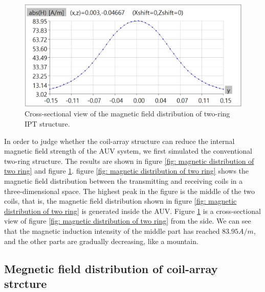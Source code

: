 \begin{figure}[!t]
    \centering
    \includegraphics[width=0.9\linewidth]{images/4_two_ring_near_field_distribution_cut.JPG}
    \caption{Cross-sectional view of the magnetic field distribution of two-ring IPT structure.}
    \label{fig: magnetic distribution of two ring cut}
\end{figure}


In order to judge whether the coil-array structure can reduce the internal magnetic field strength of the AUV system, we first simulated the conventional two-ring structure.
The results are shown in figure \ref{fig: magnetic distribution of two ring} and figure \ref{fig: magnetic distribution of two ring cut}. figure \ref{fig: magnetic distribution of two ring} shows the magnetic field distribution between the transmitting and receiving coils in a three-dimensional space. The highest peak in the figure is the middle of the two coils, that is, the magnetic field distribution shown in figure \ref{fig: magnetic distribution of two ring} is generated inside the AUV. Figure \ref{fig: magnetic distribution of two ring cut} is a cross-sectional view of figure \ref{fig: magnetic distribution of two ring} from the side. We can see that the magnetic induction intensity of the middle part has reached $83.95A/m$, and the other parts are gradually decreasing, like a mountain.

\subsection{Megnetic field distribution of coil-array strcture}

